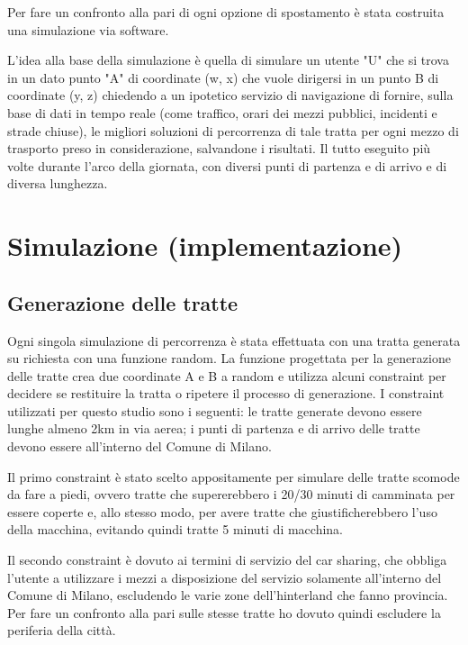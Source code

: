 Per fare un confronto alla pari di ogni opzione di spostamento è stata costruita una simulazione via software.

L'idea alla base della simulazione è quella di simulare un utente "U" che si trova in un dato punto "A" di coordinate (w, x) che vuole dirigersi in un punto B di coordinate (y, z) chiedendo a un ipotetico servizio di navigazione di fornire, sulla base di dati in tempo reale (come traffico, orari dei mezzi pubblici, incidenti e strade chiuse), le migliori soluzioni di percorrenza di tale tratta per ogni mezzo di trasporto preso in considerazione, salvandone i risultati. Il tutto eseguito più volte durante l'arco della giornata, con diversi punti di partenza e di arrivo e di diversa lunghezza.


\section{Simulazione (implementazione)}

\subsection{Generazione delle tratte}

Ogni singola simulazione di percorrenza è stata effettuata con una tratta generata su richiesta con una funzione random. La funzione progettata per la generazione delle tratte crea due coordinate A e B a random e utilizza alcuni constraint per decidere se restituire la tratta o ripetere il processo di generazione. I constraint utilizzati per questo studio sono i seguenti: le tratte generate devono essere lunghe almeno 2km in via aerea; i punti di partenza e di arrivo delle tratte devono essere all'interno del Comune di Milano.

Il primo constraint è stato scelto appositamente per simulare delle tratte scomode da fare a piedi, ovvero tratte che supererebbero i 20/30 minuti di camminata per essere coperte e, allo stesso modo, per avere tratte che giustificherebbero l'uso della macchina, evitando quindi tratte 5 minuti di macchina.

Il secondo constraint è dovuto ai termini di servizio del car sharing, che obbliga l'utente a utilizzare i mezzi a disposizione del servizio solamente all'interno del Comune di Milano, escludendo le varie zone dell'hinterland che fanno provincia. Per fare un confronto alla pari sulle stesse tratte ho dovuto quindi escludere la periferia della città.

